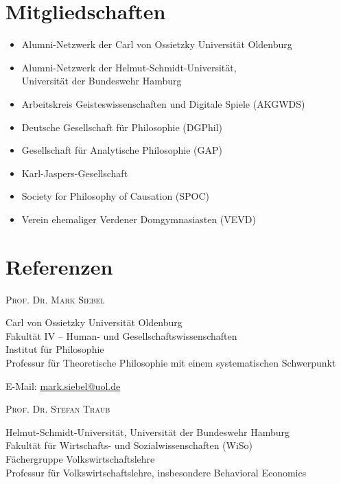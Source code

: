 \documentclass[a4paper,10pt]{article}
\begin{document}
\section{Mitgliedschaften}
\begin{itemize}
   \item Alumni-Netzwerk der Carl von Ossietzky Universität Oldenburg
   \item Alumni-Netzwerk der Helmut-Schmidt-Universität,\\Universität der Bundeswehr Hamburg
   \item Arbeitskreis Geisteswissenschaften und Digitale Spiele (AKGWDS)
   \item Deutsche Gesellschaft für Philosophie (DGPhil)
   \item Gesellschaft für Analytische Philosophie (GAP)
   \item Karl-Jaspers-Gesellschaft
   \item Society for Philosophy of Causation (SPOC)
   \item Verein ehemaliger Verdener Domgymnasiasten (VEVD)
\end{itemize}


\clearpage
\section{Referenzen}
\textsc{Prof\hspace{0.5pt}. Dr\hspace{0.5pt}. Mark Siebel}

Carl von Ossietzky Universität Oldenburg\\
Fakultät IV -- Human- und Gesellschaftswissenschaften\\
Institut für Philosophie\\
Professur für Theoretische Philosophie mit einem systematischen Schwerpunkt

E-Mail: \href{mailto:mark.siebel@uol.de}{mark.siebel@uol.de}\vspace{12pt}

\textsc{Prof\hspace{0.5pt}. Dr\hspace{0.5pt}. Stefan Traub}

Helmut-Schmidt-Universität, Universität der Bundeswehr Hamburg\\
Fakultät für Wirtschafts- und Sozialwissenschaften (WiSo)\\
Fächergruppe Volkswirtschaftslehre\\
Professur für Volkswirtschaftslehre, insbesondere Behavioral Economics
\end{document}
